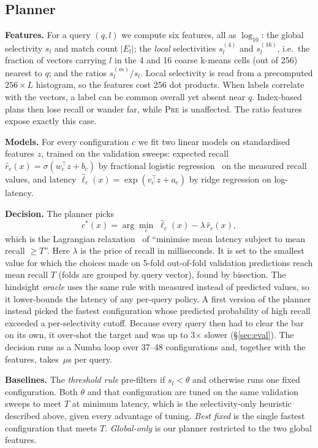 \documentclass[sigconf,nonacm]{acmart}
\newcommand{\pre}{\textsc{Pre}\xspace}
\begin{document}
\subsection{Planner}
\textbf{Features.} For a query $(q,l)$ we compute six features, all as $\log_{10}$: the global selectivity $s_l$ and match count $|E_l|$; the \emph{local} selectivities $s^{(4)}_l$ and $s^{(16)}_l$, i.e.\ the fraction of vectors carrying $l$ in the 4 and 16 coarse k-means cells (out of 256) nearest to $q$; and the ratios $s^{(m)}_l/s_l$. Local selectivity is read from a precomputed $256\times L$ histogram, so the features cost 256 dot products. When labels correlate with the vectors, a label can be common overall yet absent near $q$. Index-based plans then lose recall or wander far, while \pre is unaffected. The ratio features expose exactly this case.

\textbf{Models.} For every configuration $c$ we fit two linear models on standardised features $z$, trained on the validation sweeps: expected recall $\hat r_c(x)=\sigma(w_c^\top z+b_c)$ by fractional logistic regression~\cite{papke1996fractional} on the measured recall values, and latency $\hat\ell_c(x)=\exp(v_c^\top z+a_c)$ by ridge regression on log-latency.

\textbf{Decision.} The planner picks
\begin{equation}
c^*(x)=\arg\min_{c}\; \hat\ell_c(x)-\lambda\,\hat r_c(x),
\end{equation}
which is the Lagrangian relaxation~\cite{everett1963lagrange} of ``minimise mean latency subject to mean recall $\ge T$''. Here $\lambda$ is the price of recall in milliseconds. It is set to the smallest value for which the choices made on 5-fold out-of-fold validation predictions reach mean recall $T$ (folds are grouped by query vector), found by bisection. The hindsight \emph{oracle} uses the same rule with measured instead of predicted values, so it lower-bounds the latency of any per-query policy. A first version of the planner instead picked the fastest configuration whose predicted probability of high recall exceeded a per-selectivity cutoff. Because every query then had to clear the bar on its own, it over-shot the target and was up to 3$\times$ slower (\S\ref{sec:eval}). The decision runs as a Numba loop over 37--48 configurations and, together with the features, takes \liveSiftOverheadUs\,$\mu$s per query.

\textbf{Baselines.} The \emph{threshold rule} pre-filters if $s_l<\theta$ and otherwise runs one fixed configuration. Both $\theta$ and that configuration are tuned on the same validation sweeps to meet $T$ at minimum latency, which is the selectivity-only heuristic described above, given every advantage of tuning. \emph{Best fixed} is the single fastest configuration that meets $T$. \emph{Global-only} is our planner restricted to the two global features.
\end{document}
